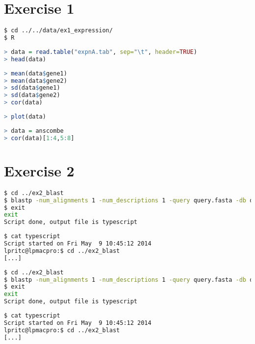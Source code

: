 \documentclass{article}
\begin{document}
\section{Exercise 1}

\begin{lstlisting}[language=bash]
$ cd ../../data/ex1_expression/
$ R
\end{lstlisting}

\begin{lstlisting}[language=R]
> data = read.table("expnA.tab", sep="\t", header=TRUE)
> head(data)
\end{lstlisting}

\begin{lstlisting}[language=R]
> mean(data$gene1)
> mean(data$gene2)
> sd(data$gene1)
> sd(data$gene2)
> cor(data)
\end{lstlisting}

\begin{lstlisting}[language=R]
> plot(data)
\end{lstlisting}

\begin{lstlisting}[language=R]
> data = anscombe
> cor(data)[1:4,5:8]
\end{lstlisting}

\section{Exercise 2}

\begin{lstlisting}[language=bash]
$ cd ../ex2_blast
$ blastp -num_alignments 1 -num_descriptions 1 -query query.fasta -db dbA
$ exit
exit
Script done, output file is typescript
\end{lstlisting} 

\begin{lstlisting}[language=bash]
$ cat typescript
Script started on Fri May  9 10:45:12 2014
lpritc@lpmacpro:$ cd ../ex2_blast
[...]
\end{lstlisting}   

\begin{lstlisting}[language=bash]
$ cd ../ex2_blast
$ blastp -num_alignments 1 -num_descriptions 1 -query query.fasta -db dbA
$ exit
exit
Script done, output file is typescript
\end{lstlisting}    

\begin{lstlisting}[language=bash]
$ cat typescript
Script started on Fri May  9 10:45:12 2014
lpritc@lpmacpro:$ cd ../ex2_blast
[...]
\end{lstlisting}   
\end{document}

